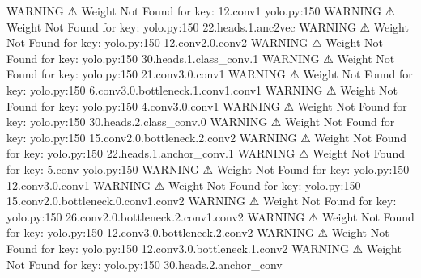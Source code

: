                     WARNING  ⚠ Weight Not Found for key: 12.conv1      yolo.py:150
                    WARNING  ⚠ Weight Not Found for key:               yolo.py:150
                             22.heads.1.anc2vec                                   
                    WARNING  ⚠ Weight Not Found for key:               yolo.py:150
                             12.conv2.0.conv2                                     
                    WARNING  ⚠ Weight Not Found for key:               yolo.py:150
                             30.heads.1.class_conv.1                              
                    WARNING  ⚠ Weight Not Found for key:               yolo.py:150
                             21.conv3.0.conv1                                     
                    WARNING  ⚠ Weight Not Found for key:               yolo.py:150
                             6.conv3.0.bottleneck.1.conv1.conv1                   
                    WARNING  ⚠ Weight Not Found for key:               yolo.py:150
                             4.conv3.0.conv1                                      
                    WARNING  ⚠ Weight Not Found for key:               yolo.py:150
                             30.heads.2.class_conv.0                              
                    WARNING  ⚠ Weight Not Found for key:               yolo.py:150
                             15.conv2.0.bottleneck.2.conv2                        
                    WARNING  ⚠ Weight Not Found for key:               yolo.py:150
                             22.heads.1.anchor_conv.1                             
                    WARNING  ⚠ Weight Not Found for key: 5.conv        yolo.py:150
                    WARNING  ⚠ Weight Not Found for key:               yolo.py:150
                             12.conv3.0.conv1                                     
                    WARNING  ⚠ Weight Not Found for key:               yolo.py:150
                             15.conv2.0.bottleneck.0.conv1.conv2                  
                    WARNING  ⚠ Weight Not Found for key:               yolo.py:150
                             26.conv2.0.bottleneck.2.conv1.conv2                  
                    WARNING  ⚠ Weight Not Found for key:               yolo.py:150
                             12.conv3.0.bottleneck.2.conv2                        
                    WARNING  ⚠ Weight Not Found for key:               yolo.py:150
                             12.conv3.0.bottleneck.1.conv2                        
                    WARNING  ⚠ Weight Not Found for key:               yolo.py:150
                             30.heads.2.anchor_conv                               
